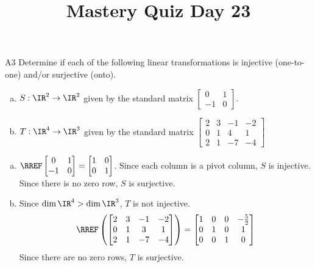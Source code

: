 \documentclass{sbgLAquiz}
\title{Mastery Quiz Day 23 }
\begin{document}
\begin{problem}{A3}
Determine if each of the following linear transformations is injective (one-to-one) and/or surjective (onto).
\begin{enumerate}[(a)]
\item $S: \IR^2 \rightarrow \IR^2$ given by the standard matrix $\begin{bmatrix} 0 & 1 \\ -1 & 0 \end{bmatrix}$.
\item $T: \IR^4 \rightarrow \IR^3$ given by the standard matrix $\begin{bmatrix} 2 & 3 & -1 & -2 \\ 0 & 1 & 4 & 1 \\ 2 & 1 & -7 & -4 \end{bmatrix}$
\end{enumerate}
\end{problem}
\begin{solution}
\begin{enumerate}[(a)]
\item $ \RREF\begin{bmatrix} 0 & 1 \\ -1 & 0 \end{bmatrix}=\begin{bmatrix}1 & 0 \\ 0 & 1 \end{bmatrix}$.  Since each column is a pivot column, $S$ is injective.  Since there is no zero row, $S$ is surjective.
\item Since $\dim \IR^4 > \dim \IR^3$, $T$ is not injective.
$$\RREF\left(\begin{bmatrix} 2 & 3 & -1 & -2 \\ 0 & 1 & 3 & 1 \\ 2 & 1 & -7 & -4 \end{bmatrix}\right) = \begin{bmatrix} 1 & 0 & 0 & -\frac{5}{2} \\ 0 & 1 & 0 & 1 \\ 0 & 0 & 1 & 0\end{bmatrix}$$
Since there are no zero rows, $T$ is surjective.
\end{enumerate}
\end{solution}
\end{document}
